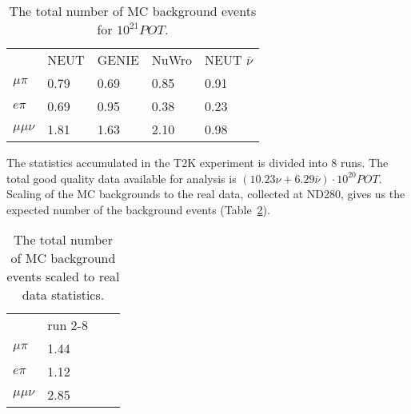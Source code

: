 \documentclass[../main.tex]{subfiles}
\begin{document}
\begin{table}[!ht]
\begin{center}
\begin{tabular}{lllll}
                              & NEUT                    & GENIE                   & NuWro               & NEUT $\bar{\nu}$  \\
  $\mu\pi$ \hspace{0.5cm}     & 0.79   \hspace{1cm}     & 0.69  \hspace{1cm}      & 0.85  \hspace{1cm}  & 0.91              \\
  $e\pi$                      & 0.69                    & 0.95                    & 0.38                & 0.23              \\
  $\mu\mu\nu$                 & 1.81                    & 1.63                    & 2.10                & 0.98              \\
\end{tabular}
\caption{The total number of MC background events for $10^{21} POT$.}
\label{tbl:HNL:bg}
\end{center}
\end{table}

The statistics accumulated in the T2K experiment is divided into 8 runs. The total good quality data available for analysis is $\left(10.23\nu+6.29\bar{\nu}\right)\cdot 10^{20}POT$. Scaling of the MC backgrounds to the real data, collected at ND280, gives us the expected number of the background events (Table~\ref{tbl:HNL:bgScale}).

\begin{table}[!ht]
\begin{center}
\begin{tabular}{llll}
                            & run 2-8               \\
  $\mu\pi$ \hspace{0.5cm}   & 1.44  \hspace{2cm}    \\
  $e\pi$                    & 1.12                  \\
  $\mu\mu\nu$               & 2.85                  \\
\end{tabular}
\caption{The total number of MC background events scaled to real data statistics.}
\label{tbl:HNL:bgScale}
\end{center}
\end{table}
\end{document}
